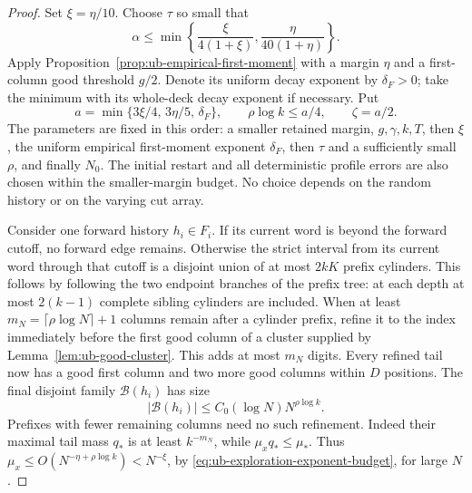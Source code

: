 \documentclass[11pt]{article}
\numberwithin{equation}{section}
\newcommand{\1}{\mathbf 1}
\begin{document}
\begin{proof}
Set \(\xi=\eta/10\). Choose \(\tau\) so small that
\begin{equation}
\label{eq:ub-exploration-alpha-budget}
 \alpha\le\min\left\{\frac{\xi}{4(1+\xi)},
                         \frac{\eta}{40(1+\eta)}\right\}.
\end{equation}
Apply Proposition~\ref{prop:ub-empirical-first-moment} with a
margin $\eta$ and a first-column good threshold \(g/2\).
Denote its uniform decay exponent by \(\delta_F>0\); take the
minimum with its whole-deck decay exponent if necessary. Put
\begin{equation}
\label{eq:ub-exploration-exponent-budget}
 a=\min\{3\xi/4,\,3\eta/5,\,\delta_F\},\qquad
 \rho\log k\le a/4,\qquad \zeta=a/2.
\end{equation}
The parameters are fixed in this order: a smaller retained margin,
\(g,\gamma,k,T\), then \(\xi\), the uniform empirical
first-moment exponent \(\delta_F\), then \(\tau\) and a
sufficiently small \(\rho\), and finally \(N_0\). The initial
restart and all deterministic profile errors are also chosen within
the smaller-margin budget. No choice depends on the random history
or on the varying cut array.

Consider one forward history \(h_i\in F_i\). If its current word
is beyond the forward cutoff, no forward edge remains. Otherwise
the strict interval from its current word through that cutoff is
a disjoint union of at most \(2kK\) prefix cylinders. This follows
by following the two endpoint branches of the prefix tree: at
each depth at most \(2(k-1)\) complete sibling cylinders are
included. When at least $m_N=\lceil\rho\log N\rceil+1$ columns remain
after a cylinder prefix, refine it to the index immediately before
the first good column of a cluster supplied by
Lemma~\ref{lem:ub-good-cluster}. This adds at most $m_N$ digits. Every refined tail now has a good
first column and two more good columns within \(D\) positions.
The final disjoint family \(\mathcal B(h_i)\) has size
\begin{equation}
\label{eq:ub-exploration-block-count}
 |\mathcal B(h_i)|\le C_0(\log N)N^{\rho\log k}.
\end{equation}
Prefixes with fewer remaining columns need no such refinement.
Indeed their maximal tail mass \(q_*\) is at least
$k^{-m_N}$, while
\(\mu_xq_*\le\mu_*\). Thus
\(\mu_x\le O(N^{-\eta+\rho\log k})<N^{-\xi}\), by
\eqref{eq:ub-exploration-exponent-budget}, for large \(N\).


\end{proof}
\end{document}
